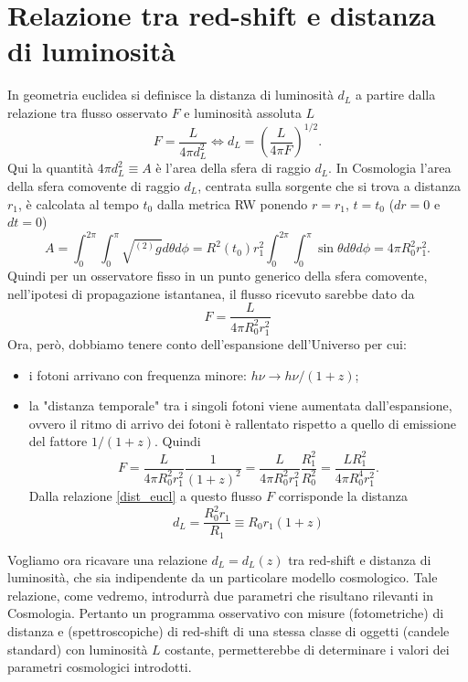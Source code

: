 \section{Relazione tra red-shift e distanza di luminosità}

In geometria euclidea si definisce la distanza di luminosità $d_L$ a partire
dalla relazione tra flusso osservato $F$ e luminosità assoluta $L$
\begin{equation}
  F = \frac{L}{4 \pi d^2_L} \iff d_L = \left(\frac{L}{4 \pi F} \right)^{1/2}.
  \label{dist_eucl}
\end{equation}
Qui la quantità $4 \pi d^2_L \equiv A$ è l'area della sfera di raggio $d_L$.  In
Cosmologia l'area della sfera comovente di raggio $d_L$, centrata sulla sorgente
che si trova a distanza $r_1$, è calcolata al tempo $t_0$ dalla metrica RW
ponendo $r=r_1$, $t=t_0$ ($dr=0$ e $dt=0$)
\begin{equation}
  A = \int_0^{2 \pi} \int_{0}^{\pi} \sqrt {^{(2)}g} d\theta d\phi = R^2(t_0)
  r^2_1 \int_0^{2 \pi} \int_{0}^{\pi} \sin \theta d\theta d\phi = 4 \pi R^2_0
  r^2_1.
\end{equation}
Quindi per un osservatore fisso in un punto generico della sfera comovente,
nell'ipotesi di propagazione istantanea, il flusso ricevuto sarebbe dato da
\begin{equation}
  F = \frac{L}{4 \pi R^2_0 r^2_1}
\end{equation}
Ora, però, dobbiamo tenere conto dell'espansione dell'Universo per cui:
\begin{itemize}
\item i fotoni arrivano con frequenza minore: $h \nu \to h \nu /(1+z)$;
\item la "distanza temporale" tra i singoli fotoni viene aumentata
  dall'espansione, ovvero il ritmo di arrivo dei fotoni è rallentato rispetto a
  quello di emissione del fattore $1/(1+z)$.  Quindi
  \begin{equation}
    F = \frac{L}{4 \pi R^2_0 r^2_1} \frac{1}{(1+z)^2} = \frac{L}{4 \pi R^2_0
      r^2_1} \frac{R^2_1}{R^2_0} = \frac{L R^2_1}{4 \pi R^4_0 r^2_1}.
  \end{equation}
  Dalla relazione \eqref{dist_eucl} a questo flusso $F$ corrisponde la distanza
  \begin{equation}
    d_L = \frac{R^2_0 r_1} {R_1} \equiv R_0 r_1 (1+z)
    \label{dis_lum}
  \end{equation}
\end{itemize}

Vogliamo ora ricavare una relazione $d_L=d_L(z)$ tra red-shift e distanza di
luminosità, che sia indipendente da un particolare modello cosmologico. Tale
relazione, come vedremo, introdurrà due parametri che risultano rilevanti in
Cosmologia. Pertanto un programma osservativo con misure (fotometriche) di
distanza e (spettroscopiche) di red-shift di una stessa classe di oggetti
(candele standard) con luminosità $L$ costante, permetterebbe di determinare i
valori dei parametri cosmologici introdotti.

